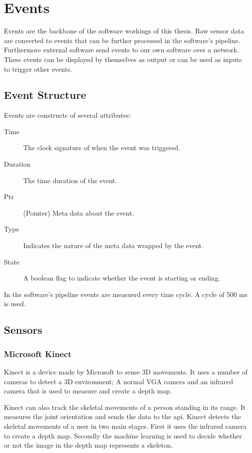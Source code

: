 \documentclass[12pt, a4paper, fleqn]{memoir}%
\begin{document}
\chapter{Events}
\label{chap:Events}
Events are the backbone of the software workings of this thesis. Raw sensor data are converted to events that can be further processed in the software's pipeline. Furthermore external software send events to our own software over a network. These events can be displayed by themselves as output or can be used as inputs to trigger other events.

\section{Event Structure}
Events are constructs of several attributes:

\begin{description}
  \item[Time] The clock signature of when the event was triggered.
  \item[Duration] The time duration of the event.
  \item[Ptr] (Pointer) Meta data about the event.
  \item[Type] Indicates the nature of the meta data wrapped by the event.
  \item[State] A boolean flag to indicate whether the event is starting or ending.
\end{description}

In the software's pipeline events are measuerd every time cycle. A cycle of 500 ms is used.

\section{Sensors}
\label{sec:Sensors}

\subsection{Microsoft Kinect}
Kinect is a device made by Microsoft to sense 3D movements. It uses a number of cameras to detect a 3D environment; A normal VGA camera and an infrared camera that is used to measure and create a depth map.

Kinect can also track the skeletal movements of a person standing in its range. It measures the joint orientation and sends the data to the api. Kinect detects the skeletal movements of a user in two main stages. First it uses the infrared camera to create a depth map. Secondly the machine learning is used to decide whether or not the image in the depth map represents a skeleton.
\end{document}
